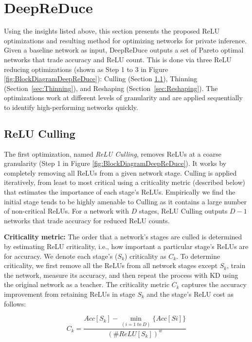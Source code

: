 

\section{DeepReDuce} 
\label{sec:Method}

Using the insights listed above, this section presents the proposed ReLU optimizations and
resulting method for optimizing networks for private inference.
Given a baseline network as input,
DeepReDuce outputs a set of Pareto optimal networks 
that trade accuracy and ReLU count.
This is done via three ReLU reducing optimizations 
(shown as Step 1 to 3 in Figure \ref{fig:BlockDiagramDeepReDuce}):
Culling (Section \ref{sec:culling}), Thinning  (Section~\ref{sec:Thinning}), and Reshaping (Section~\ref{sec:Reshaping}). 
The optimizations work at different levels of granularity and are applied sequentially
to identify high-performing networks quickly.


\subsection{ReLU Culling}
\label{sec:culling}

The first optimization, named \textit{ReLU Culling}, 
removes ReLUs at a coarse granularity (Step 1 in Figure \ref{fig:BlockDiagramDeepReDuce}).
It works by completely removing all ReLUs from a given network stage.
Culling is applied iteratively,
from least to most critical using a criticality metric (described below)
that estimates the importance of each stage's ReLUs.  
Empirically we find the initial stage tends to be highly amenable to Culling as it 
contains a large number of non-critical ReLUs.
For a network with $D$ stages, ReLU Culling outputs $D-1$ networks that trade accuracy for reduced ReLU counts.

{\bf Criticality metric:} 
The order that a network's stages are culled is determined by estimating ReLU criticality,
i.e., how important a particular stage's ReLUs are for accuracy.
We denote each stage's ($S_k$) criticality as $C_k$.
To determine criticality, we first remove all the ReLUs from all network stages except $S_k$,
train the network, measure its accuracy, and then repeat the process with KD using the original network as a teacher. 
The criticality metric $C_k$ captures the accuracy improvement from retaining ReLUs in stage $S_k$ and the stage's ReLU cost as follows:

\begin{equation} \label{eqn:CriticalityMetric}
C_k = \frac{Acc [S_k] - \min_{(i=1 \; to \; D)} \{ Acc[Si] \}}{(\#ReLU [S_k])^{w}}  
\end{equation}

